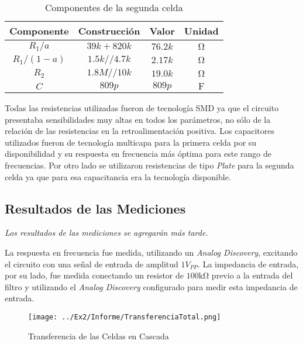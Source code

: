 \begin{table}[ht]
\begin{center}
\begin{tabular}{||c|c|c|c||}
\hline
Componente	&	Construcción	&	Valor	&	Unidad	\\
\hline
$R_1/a$	&	$39k + 820 k$	&	$76.2 k$	&	$\si{\ohm}$	\\
$R_1/(1-a)$	&	$1.5k // 4.7 k$	&	$2.17 k$	&	$\si{\ohm}$	\\
$R_2$ &	$1.8 M // 10 k$	&$19.0k$&	$\si{\ohm}$	\\
$C$	&	$809 p$	&	$809 p$	&	$\si{\farad}$	\\
\hline
\end{tabular}
\caption{Componentes de la segunda celda}
\label{tab:e2 comp cell 2}
\end{center}
\end{table}

Todas las resistencias utilizadas fueron de tecnología SMD ya que el circuito presentaba sensibilidades muy altas en todos los parámetros, no sólo de la relación de las resistencias en la retroalimentación positiva. Los capacitores utilizados fueron de tecnología multicapa para la primera celda por su disponibilidad y su respuesta en frecuencia más óptima para este rango de frecuencias. Por otro lado se utilizaron resistencias de tipo \textit{Plate} para la segunda celda ya que para esa capacitancia era la tecnología disponible.

\subsection{Resultados de las Mediciones}

\textit{Los resultados de las mediciones se agregarán más tarde.}

La respuesta en frecuencia fue medida, utilizando un \textit{Analog Discovery}, excitando el circuito con una señal de entrada de amplitud $1 V_{PP}$. La impedancia de entrada, por su lado, fue medida conectando un resistor de $100 \si{\kilo\ohm}$ previo a la entrada del filtro y utilizando el \textit{Analog Discovery} configurado para medir esta impedancia de entrada.

\begin{figure}[ht]
\begin{center}
\texttt{[image: ../Ex2/Informe/TransferenciaTotal.png]}
\caption{Transferencia de las Celdas en Cascada}
\label{fig:e2 H total}
\end{center}
\end{figure}

